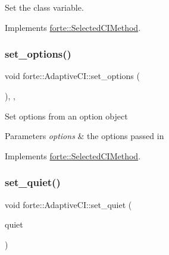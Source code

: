 Set the class variable. 



Implements \mbox{\hyperlink{classforte_1_1_selected_c_i_method_a37f95503d0241387195dc7d412fc6e78}{forte\+::\+Selected\+C\+I\+Method}}.

\mbox{\label{classforte_1_1_adaptive_c_i_a5f23c673c9c66b9b07de115a5992ae3f}} 
\subsubsection{\texorpdfstring{set\+\_\+options()}{set\_options()}}
{\footnotesize\ttfamily void forte\+::\+Adaptive\+C\+I\+::set\+\_\+options (\begin{DoxyParamCaption}\item[{std\+::shared\+\_\+ptr$<$ \mbox{\hyperlink{classforte_1_1_forte_options}{Forte\+Options}} $>$}]{ }\end{DoxyParamCaption})\hspace{0.3cm}{\ttfamily [inline]}, {\ttfamily [override]}, {\ttfamily [virtual]}}

Set options from an option object 
\begin{DoxyParams}{Parameters}
{\em options} & the options passed in \\
\hline
\end{DoxyParams}


Implements \mbox{\hyperlink{classforte_1_1_selected_c_i_method_ad03bbde3a0443ca9b01ff9605f2e06e0}{forte\+::\+Selected\+C\+I\+Method}}.

\mbox{\label{classforte_1_1_adaptive_c_i_ab0d3dddc9c0f86906150f2f2bfef4937}} 
\subsubsection{\texorpdfstring{set\+\_\+quiet()}{set\_quiet()}}
{\footnotesize\ttfamily void forte\+::\+Adaptive\+C\+I\+::set\+\_\+quiet (\begin{DoxyParamCaption}\item[{bool}]{quiet }\end{DoxyParamCaption})\hspace{0.3cm}{\ttfamily [inline]}}



